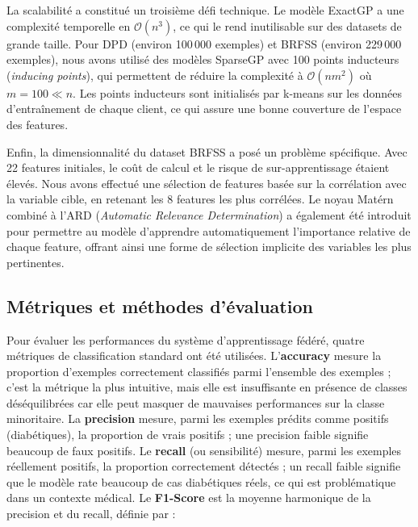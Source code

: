 \documentclass[12pt,a4paper]{article}
\begin{document}
La scalabilité a constitué un troisième défi technique. Le modèle ExactGP a une complexité temporelle en $\mathcal{O}(n^3)$, ce qui le rend inutilisable sur des datasets de grande taille. Pour DPD (environ 100\,000 exemples) et BRFSS (environ 229\,000 exemples), nous avons utilisé des modèles SparseGP avec 100 points inducteurs (\textit{inducing points}), qui permettent de réduire la complexité à $\mathcal{O}(nm^2)$ où $m = 100 \ll n$. Les points inducteurs sont initialisés par k-means sur les données d'entraînement de chaque client, ce qui assure une bonne couverture de l'espace des features.

Enfin, la dimensionnalité du dataset BRFSS a posé un problème spécifique. Avec 22 features initiales, le coût de calcul et le risque de sur-apprentissage étaient élevés. Nous avons effectué une sélection de features basée sur la corrélation avec la variable cible, en retenant les 8 features les plus corrélées. Le noyau Matérn combiné à l'ARD (\textit{Automatic Relevance Determination}) a également été introduit pour permettre au modèle d'apprendre automatiquement l'importance relative de chaque feature, offrant ainsi une forme de sélection implicite des variables les plus pertinentes.


\subsection{Métriques et méthodes d'évaluation}

Pour évaluer les performances du système d'apprentissage fédéré, quatre métriques de classification standard ont été utilisées. L'\textbf{accuracy} mesure la proportion d'exemples correctement classifiés parmi l'ensemble des exemples ; c'est la métrique la plus intuitive, mais elle est insuffisante en présence de classes déséquilibrées car elle peut masquer de mauvaises performances sur la classe minoritaire. La \textbf{precision} mesure, parmi les exemples prédits comme positifs (diabétiques), la proportion de vrais positifs ; une precision faible signifie beaucoup de faux positifs. Le \textbf{recall} (ou sensibilité) mesure, parmi les exemples réellement positifs, la proportion correctement détectés ; un recall faible signifie que le modèle rate beaucoup de cas diabétiques réels, ce qui est problématique dans un contexte médical. Le \textbf{F1-Score} est la moyenne harmonique de la precision et du recall, définie par :
\end{document}
